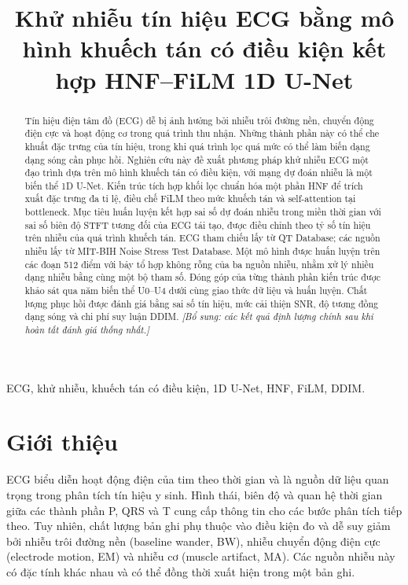 \documentclass[conference]{IEEEtran}
\newcommand{\draftnote}[1]{\textit{[Bổ sung: #1]}}
\begin{document}
\title{Khử nhiễu tín hiệu ECG bằng mô hình khuếch tán có điều kiện kết hợp HNF--FiLM 1D U-Net}

\author{
}

\maketitle

\begin{abstract}
Tín hiệu điện tâm đồ (ECG) dễ bị ảnh hưởng bởi nhiễu trôi đường nền, chuyển động điện cực và hoạt động cơ trong quá trình thu nhận. Những thành phần này có thể che khuất đặc trưng của tín hiệu, trong khi quá trình lọc quá mức có thể làm biến dạng dạng sóng cần phục hồi. Nghiên cứu này đề xuất phương pháp khử nhiễu ECG một đạo trình dựa trên mô hình khuếch tán có điều kiện, với mạng dự đoán nhiễu là một biến thể 1D U-Net. Kiến trúc tích hợp khối lọc chuẩn hóa một phần HNF để trích xuất đặc trưng đa tỉ lệ, điều chế FiLM theo mức khuếch tán và self-attention tại bottleneck. Mục tiêu huấn luyện kết hợp sai số dự đoán nhiễu trong miền thời gian với sai số biên độ STFT tương đối của ECG tái tạo, được điều chỉnh theo tỷ số tín hiệu trên nhiễu của quá trình khuếch tán. ECG tham chiếu lấy từ QT Database; các nguồn nhiễu lấy từ MIT-BIH Noise Stress Test Database. Một mô hình được huấn luyện trên các đoạn 512 điểm với bảy tổ hợp không rỗng của ba nguồn nhiễu, nhằm xử lý nhiều dạng nhiễu bằng cùng một bộ tham số. Đóng góp của từng thành phần kiến trúc được khảo sát qua năm biến thể U0--U4 dưới cùng giao thức dữ liệu và huấn luyện. Chất lượng phục hồi được đánh giá bằng sai số tín hiệu, mức cải thiện SNR, độ tương đồng dạng sóng và chi phí suy luận DDIM. \draftnote{các kết quả định lượng chính sau khi hoàn tất đánh giá thống nhất.}
\end{abstract}

\begin{IEEEkeywords}
ECG, khử nhiễu, khuếch tán có điều kiện, 1D U-Net, HNF, FiLM, DDIM.
\end{IEEEkeywords}

\section{Giới thiệu}
ECG biểu diễn hoạt động điện của tim theo thời gian và là nguồn dữ liệu quan trọng trong phân tích tín hiệu y sinh. Hình thái, biên độ và quan hệ thời gian giữa các thành phần P, QRS và T cung cấp thông tin cho các bước phân tích tiếp theo. Tuy nhiên, chất lượng bản ghi phụ thuộc vào điều kiện đo và dễ suy giảm bởi nhiễu trôi đường nền (baseline wander, BW), nhiễu chuyển động điện cực (electrode motion, EM) và nhiễu cơ (muscle artifact, MA). Các nguồn nhiễu này có đặc tính khác nhau và có thể đồng thời xuất hiện trong một bản ghi\cite{chiang2019,nstdb}.
\end{document}
